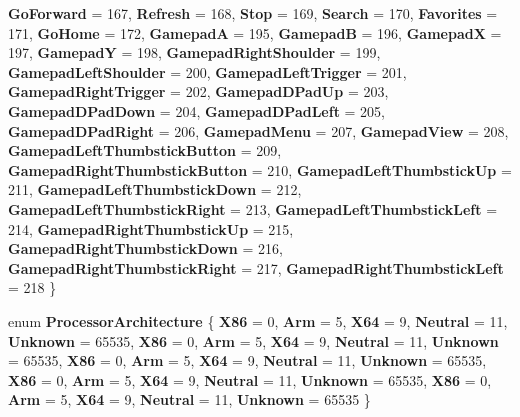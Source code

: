 \begin{DoxyCompactItemize}
\newline
{\bfseries Go\+Forward} = 167, 
{\bfseries Refresh} = 168, 
{\bfseries Stop} = 169, 
{\bfseries Search} = 170, 
\newline
{\bfseries Favorites} = 171, 
{\bfseries Go\+Home} = 172, 
{\bfseries GamepadA} = 195, 
{\bfseries GamepadB} = 196, 
\newline
{\bfseries GamepadX} = 197, 
{\bfseries GamepadY} = 198, 
{\bfseries Gamepad\+Right\+Shoulder} = 199, 
{\bfseries Gamepad\+Left\+Shoulder} = 200, 
\newline
{\bfseries Gamepad\+Left\+Trigger} = 201, 
{\bfseries Gamepad\+Right\+Trigger} = 202, 
{\bfseries Gamepad\+D\+Pad\+Up} = 203, 
{\bfseries Gamepad\+D\+Pad\+Down} = 204, 
\newline
{\bfseries Gamepad\+D\+Pad\+Left} = 205, 
{\bfseries Gamepad\+D\+Pad\+Right} = 206, 
{\bfseries Gamepad\+Menu} = 207, 
{\bfseries Gamepad\+View} = 208, 
\newline
{\bfseries Gamepad\+Left\+Thumbstick\+Button} = 209, 
{\bfseries Gamepad\+Right\+Thumbstick\+Button} = 210, 
{\bfseries Gamepad\+Left\+Thumbstick\+Up} = 211, 
{\bfseries Gamepad\+Left\+Thumbstick\+Down} = 212, 
\newline
{\bfseries Gamepad\+Left\+Thumbstick\+Right} = 213, 
{\bfseries Gamepad\+Left\+Thumbstick\+Left} = 214, 
{\bfseries Gamepad\+Right\+Thumbstick\+Up} = 215, 
{\bfseries Gamepad\+Right\+Thumbstick\+Down} = 216, 
\newline
{\bfseries Gamepad\+Right\+Thumbstick\+Right} = 217, 
{\bfseries Gamepad\+Right\+Thumbstick\+Left} = 218
 \}
\item 
\mbox{\label{namespace_windows_1_1_system_a9ba7fe5d0a9bba15cd53379017c5f593}} 
enum {\bfseries Processor\+Architecture} \{ \newline
{\bfseries X86} = 0, 
{\bfseries Arm} = 5, 
{\bfseries X64} = 9, 
{\bfseries Neutral} = 11, 
\newline
{\bfseries Unknown} = 65535, 
{\bfseries X86} = 0, 
{\bfseries Arm} = 5, 
{\bfseries X64} = 9, 
\newline
{\bfseries Neutral} = 11, 
{\bfseries Unknown} = 65535, 
{\bfseries X86} = 0, 
{\bfseries Arm} = 5, 
\newline
{\bfseries X64} = 9, 
{\bfseries Neutral} = 11, 
{\bfseries Unknown} = 65535, 
{\bfseries X86} = 0, 
\newline
{\bfseries Arm} = 5, 
{\bfseries X64} = 9, 
{\bfseries Neutral} = 11, 
{\bfseries Unknown} = 65535, 
\newline
{\bfseries X86} = 0, 
{\bfseries Arm} = 5, 
{\bfseries X64} = 9, 
{\bfseries Neutral} = 11, 
\newline
{\bfseries Unknown} = 65535
 \}
\end{DoxyCompactItemize}
